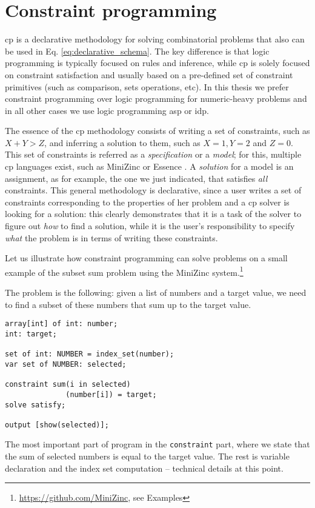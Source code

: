 \section{Constraint programming} 
\pubrev
\acrlong{cp} is a declarative methodology for solving combinatorial
problems that also can be used in Eq. \ref{eq:declarative_schema}. The
key difference is that logic programming is typically focused on rules
and inference, while \acrshort{cp} is solely focused on constraint
satisfaction and usually based on a pre-defined set of constraint
primitives (such as comparison, sets operations, etc). In this thesis
we prefer constraint programming over logic programming for
numeric-heavy problems and in all other cases we use logic programming \acrshort{asp} or \acrshort{idp}.
\pubrevend

The essence of the \acrshort{cp} methodology consists of writing a set of
constraints, such as $X + Y > Z$, and inferring a solution to them, such
as $X = 1, Y = 2$ and $Z = 0$. This set of constraints is referred as
a \textit{specification} or a \textit{model}; for this, multiple \acrlong{cp}
languages exist, such as MiniZinc \parencite{minizinc} or Essence
\parencite{essence}. A \textit{solution} for
a model is an assignment, as for example, the one we just indicated, that satisfies
\textit{all} constraints. This general methodology is declarative,
since a user writes a set of constraints corresponding to the
properties of her problem and a \acrshort{cp} solver is looking for a
solution: this clearly demonstrates that it is a task of the solver
to figure out \textit{how} to find a solution, while it is the user's
responsibility to specify \textit{what} the problem is in terms of
writing these constraints.

\begin{example}
    Let us illustrate how constraint programming can solve problems on
    a small example of the subset sum problem using the MiniZinc
    system.\footnote{\url{https://github.com/MiniZinc}, see Examples} 

The problem is the following: given a list of numbers and a target
    value, we need to find a subset of these numbers that sum up to
    the target value.
    \begin{minipage}{\linewidth}
    \begin{lstlisting}[caption=An example of a MiniZinc program, label=lst:example_asp_program,basicstyle=\ttfamily]
array[int] of int: number;
int: target;

set of int: NUMBER = index_set(number);
var set of NUMBER: selected;

constraint sum(i in selected)
              (number[i]) = target;
solve satisfy;

output [show(selected)];
\end{lstlisting}
\end{minipage}
The most important part of program in the \texttt{constraint}
part, where we state that the sum of selected numbers is equal to
the target value. The rest is variable declaration and the index
set computation -- technical details at this point.
\end{example}


